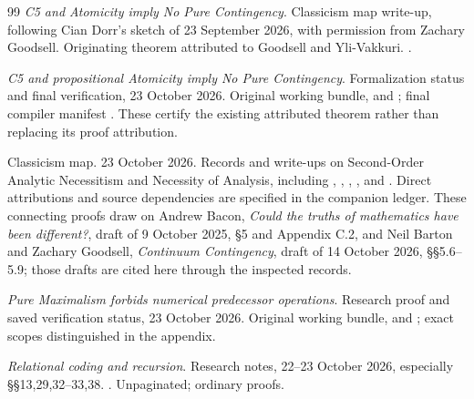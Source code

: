 \documentclass[11pt]{article}
\begin{document}
\begin{thebibliography}{99}
\emph{C5 and Atomicity imply No Pure Contingency}.
Classicism map write-up, following Cian Dorr's sketch of
23 September 2026, with permission from Zachary Goodsell.
Originating theorem attributed to Goodsell and Yli-Vakkuri.
.

\emph{C5 and propositional Atomicity imply No Pure Contingency}.
Formalization status and final verification, 23 October 2026.
Original working bundle,
and ; final compiler manifest
.
These certify the existing attributed theorem rather than replacing its proof attribution.

Classicism map. 23 October 2026.
Records and write-ups on Second-Order Analytic Necessitism and Necessity of
Analysis, including
,
,
,
,
and .
Direct attributions and source dependencies are specified in the companion ledger.
These connecting proofs draw on Andrew Bacon,
\emph{Could the truths of mathematics have been different?},
draft of 9 October 2025, \S5 and Appendix C.2, and Neil Barton and
Zachary Goodsell, \emph{Continuum Contingency}, draft of 14 October 2026,
\S\S5.6--5.9; those drafts are cited here through the inspected records.

\emph{Pure Maximalism forbids numerical predecessor operations}.
Research proof and saved verification status, 23 October 2026.
Original working bundle,
and ; exact scopes distinguished in the appendix.

\emph{Relational coding and recursion}. Research notes, 22--23 October 2026,
especially \S\S13,29,32--33,38.
.
Unpaginated; ordinary proofs.


\end{thebibliography}
\end{document}
